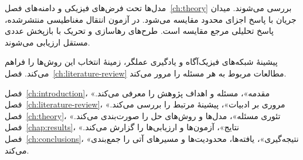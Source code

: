 مدل‌ها تحت فرض‌های فیزیکی و دامنه‌های فصل~\ref{ch:theory} بررسی می‌شوند.
میدان جریان با پاسخ اجزای محدود مقایسه می‌شود.
در آزمون انتقال مغناطیسی منتشرشده، پاسخ تحلیلی مرجع مقایسه است.
طرح‌های رهاسازی و تحریک با بازپخش عددی مستقل ارزیابی می‌شوند.

پیشینهٔ شبکه‌های فیزیک‌آگاه و یادگیری عملگر، زمینهٔ انتخاب این روش‌ها را فراهم می‌کند.
فصل~\ref{ch:literature-review} مطالعات مربوط به هر مسئله را مرور می‌کند.


فصل~\ref{ch:introduction}، «مقدمه»، مسئله و اهداف پژوهش را معرفی می‌کند.
فصل~\ref{ch:literature-review}، «مروری بر ادبیات»، پیشینهٔ مرتبط را بررسی می‌کند.
فصل~\ref{ch:theory}، «تئوری مسئله»، مدل‌ها و روش‌های حل را صورت‌بندی می‌کند.
فصل~\ref{chap:results}، «نتایج»، آزمون‌ها و ارزیابی‌ها را گزارش می‌کند.
فصل~\ref{ch:conclusions}، «نتیجه‌گیری»، یافته‌ها، محدودیت‌ها و مسیرهای آتی را جمع‌بندی می‌کند.
